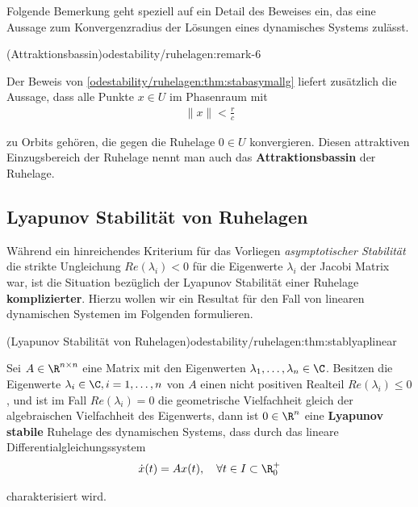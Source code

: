 \documentclass[letterpaper,10pt,english]{jupyterBook}
\begin{document}
\par
Folgende Bemerkung geht speziell auf ein Detail des Beweises ein, das eine Aussage zum Konvergenzradius der Lösungen eines dynamisches Systems zulässt.
\begin{remark}{(Attraktionsbassin)}{odestability/ruhelagen:remark-6}



\par
Der Beweis von \cref{odestability/ruhelagen:thm:stabasymallg} liefert zusätzlich die Aussage, dass alle Punkte \(x\in U\) im Phasenraum mit
\begin{align*}
\|x\| < \frac{r}{c}
\end{align*}
\par
zu Orbits gehören, die gegen die Ruhelage \(0 \in U\) konvergieren.
Diesen attraktiven Einzugsbereich der Ruhelage nennt man auch das \textbf{Attraktionsbassin} der Ruhelage.
\end{remark}


\subsection{Lyapunov Stabilität von Ruhelagen}
\label{\detokenize{odestability/ruhelagen:lyapunov-stabilitat-von-ruhelagen}}
\par
Während ein hinreichendes Kriterium für das Vorliegen \emph{asymptotischer Stabilität} die strikte Ungleichung \(Re(\lambda_i)<0\) für die Eigenwerte \(\lambda_i\) der Jacobi Matrix war, ist die Situation bezüglich der Lyapunov Stabilität einer Ruhelage \textbf{komplizierter}.
Hierzu wollen wir ein Resultat für den Fall von linearen dynamischen Systemen im Folgenden formulieren.
\begin{theorem}{(Lyapunov Stabilität von Ruhelagen)}{odestability/ruhelagen:thm:stablyaplinear}



\par
Sei \(A\in \R^{n\times n}\) eine Matrix mit den Eigenwerten \(\lambda_1,\dots, \lambda_n\in \C\).
Besitzen die Eigenwerte \(\lambda_i \in \C, i=1,\ldots,n\) von \(A\) einen nicht positiven Realteil \(Re(\lambda_i) \leq 0\), und ist im Fall \(Re(\lambda_i)=0\) die geometrische Vielfachheit gleich der algebraischen Vielfachheit des Eigenwerts, dann ist \(0\in \R^n\) eine \textbf{Lyapunov stabile} Ruhelage des dynamischen Systems, dass durch das lineare Differentialgleichungssystem
\begin{align*}
\dot{x}(t) = Ax(t), \quad  \forall t \in I \subset \R^+_0
\end{align*}
\par
charakterisiert wird.
\end{theorem}
\end{document}
